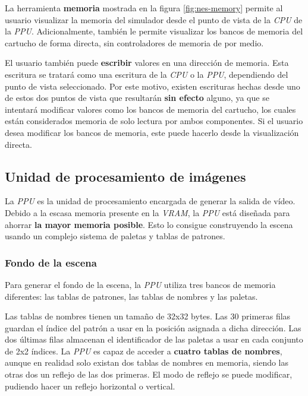 La herramienta \textbf{memoria} mostrada en la
figura \ref{fig:nes-memory} permite
al usuario visualizar la memoria del simulador desde
el punto de vista de la \textit{CPU} de la \textit{PPU}.
Adicionalmente, también le permite visualizar los bancos
de memoria del cartucho de forma directa, sin controladores
de memoria de por medio.

El usuario también puede \textbf{escribir} valores en una
dirección de memoria.
Esta escritura se tratará como una escritura de la \textit{CPU}
o la \textit{PPU}, dependiendo del punto de vista seleccionado.
Por este motivo, existen escrituras hechas desde uno de estos
dos puntos de vista que resultarán \textbf{sin efecto} alguno,
ya que se intentará modificar valores como los bancos de memoria
del cartucho, los cuales están considerados memoria de solo
lectura por ambos componentes.
Si el usuario desea modificar los bancos de memoria, este puede
hacerlo desde la visualización directa.

\subsection{Unidad de procesamiento de imágenes}\label{subsec:unidad-de-procesamiento-de-imagenes}

La \textit{PPU} es la unidad de procesamiento encargada de generar
la salida de vídeo.
Debido a la escasa memoria presente en la \textit{VRAM}, la \textit{PPU}
está diseñada para ahorrar \textbf{la mayor memoria posible}.
Esto lo consigue construyendo la escena usando un complejo
sistema de paletas y tablas de patrones.

\subsubsection{Fondo de la escena}\label{subsubsec:fondo-de-la-escena}

Para generar el fondo de la escena, la \textit{PPU} utiliza
tres bancos de memoria diferentes: las tablas de patrones,
las tablas de nombres y las paletas.

Las tablas de nombres tienen un tamaño de 32x32 bytes.
Las 30 primeras filas guardan el índice del patrón
a usar en la posición asignada a dicha dirección.
Las dos últimas filas almacenan el identificador de las
paletas a usar en cada conjunto de 2x2 índices.
La \textit{PPU} es capaz de acceder a \textbf{cuatro tablas
de nombres}, aunque en realidad solo existan dos
tablas de nombres en memoria, siendo las otras dos
un reflejo de las dos primeras.
El modo de reflejo se puede modificar, pudiendo
hacer un reflejo horizontal o vertical.

